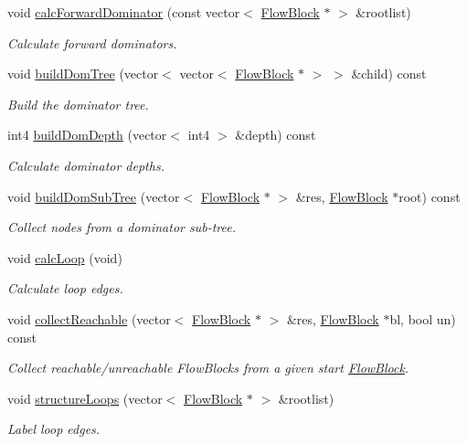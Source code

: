 \begin{DoxyCompactItemize}
void \mbox{\hyperlink{class_block_graph_a9026a993cc70a3e67c5eeb19d33a9d98}{calc\+Forward\+Dominator}} (const vector$<$ \mbox{\hyperlink{class_flow_block}{Flow\+Block}} $\ast$ $>$ \&rootlist)
\begin{DoxyCompactList}\small\item\em Calculate forward dominators. \end{DoxyCompactList}\item 
void \mbox{\hyperlink{class_block_graph_ab762df4b2281775e41b38a38d9f5509f}{build\+Dom\+Tree}} (vector$<$ vector$<$ \mbox{\hyperlink{class_flow_block}{Flow\+Block}} $\ast$ $>$ $>$ \&child) const
\begin{DoxyCompactList}\small\item\em Build the dominator tree. \end{DoxyCompactList}\item 
int4 \mbox{\hyperlink{class_block_graph_afc33c821dd221280e2d73d24011a5aa7}{build\+Dom\+Depth}} (vector$<$ int4 $>$ \&depth) const
\begin{DoxyCompactList}\small\item\em Calculate dominator depths. \end{DoxyCompactList}\item 
void \mbox{\hyperlink{class_block_graph_a044fa551f0aae9c919884772774e11ee}{build\+Dom\+Sub\+Tree}} (vector$<$ \mbox{\hyperlink{class_flow_block}{Flow\+Block}} $\ast$ $>$ \&res, \mbox{\hyperlink{class_flow_block}{Flow\+Block}} $\ast$root) const
\begin{DoxyCompactList}\small\item\em Collect nodes from a dominator sub-\/tree. \end{DoxyCompactList}\item 
void \mbox{\hyperlink{class_block_graph_aa65051f403ce79d384a76c4399cdad80}{calc\+Loop}} (void)
\begin{DoxyCompactList}\small\item\em Calculate loop edges. \end{DoxyCompactList}\item 
void \mbox{\hyperlink{class_block_graph_a48b70c7238548053a1cc3629b8df081b}{collect\+Reachable}} (vector$<$ \mbox{\hyperlink{class_flow_block}{Flow\+Block}} $\ast$ $>$ \&res, \mbox{\hyperlink{class_flow_block}{Flow\+Block}} $\ast$bl, bool un) const
\begin{DoxyCompactList}\small\item\em Collect reachable/unreachable Flow\+Blocks from a given start \mbox{\hyperlink{class_flow_block}{Flow\+Block}}. \end{DoxyCompactList}\item 
void \mbox{\hyperlink{class_block_graph_a468717bd5cf1e3bd34e5221a5d425bd9}{structure\+Loops}} (vector$<$ \mbox{\hyperlink{class_flow_block}{Flow\+Block}} $\ast$ $>$ \&rootlist)
\begin{DoxyCompactList}\small\item\em Label loop edges. \end{DoxyCompactList}\end{DoxyCompactItemize}

